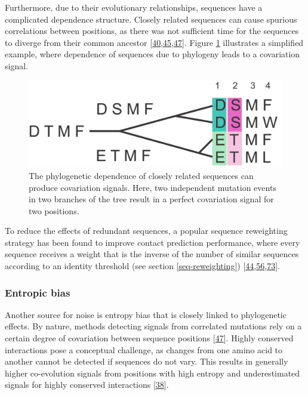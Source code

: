 \documentclass[12pt,a4paper,twoside]{book}
\theoremstyle{definition}
\theoremstyle{definition}
\theoremstyle{remark}
\begin{document}
Furthermore, due to their evolutionary relationships, sequences have a
complicated dependence structure. Closely related sequences can cause
spurious correlations between positions, as there was not sufficient
time for the sequences to diverge from their common ancestor
{[}\protect\hyperlink{ref-Gouveia_Oliveira2007}{40},\protect\hyperlink{ref-Lapedes1999}{45},\protect\hyperlink{ref-Burger2010}{47}{]}.
Figure \ref{fig:phylogenetic-effect} illustrates a simplified example,
where dependence of sequences due to phylogeny leads to a covariation
signal.






\begin{figure}

{\centering \includegraphics[width=0.5\linewidth]{img/intro/phylogenetic_effect} 

}

\caption{The phylogenetic dependence of closely
related sequences can produce covariation signals. Here, two independent
mutation events in two branches of the tree result in a perfect
covariation signal for two positions.}\label{fig:phylogenetic-effect}
\end{figure}

To reduce the effects of redundant sequences, a popular sequence
reweighting strategy has been found to improve contact prediction
performance, where every sequence receives a weight that is the inverse
of the number of similar sequences according to an identity threshold
(see section \ref{seq-reweighting})
{[}\protect\hyperlink{ref-Jones2012}{44},\protect\hyperlink{ref-Morcos2011}{56},\protect\hyperlink{ref-Buslje2009}{73}{]}.

\subsubsection*{Entropic bias}\label{entropic-bias}

Another source for noise is entropy bias that is closely linked to
phylogenetic effects. By nature, methods detecting signals from
correlated mutations rely on a certain degree of covariation between
sequence positions {[}\protect\hyperlink{ref-Burger2010}{47}{]}. Highly
conserved interactions pose a conceptual challenge, as changes from one
amino acid to another cannot be detected if sequences do not vary. This
results in generally higher co-evolution signals from positions with
high entropy and underestimated signals for highly conserved
interactions {[}\protect\hyperlink{ref-Fodor2004}{38}{]}.
\end{document}
